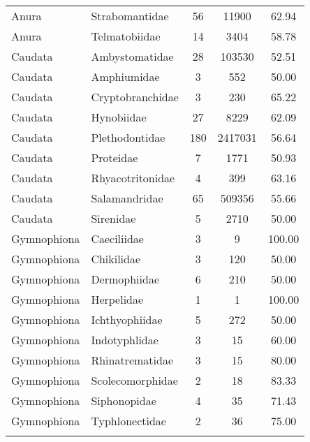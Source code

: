 \begin{longtable}{llccc}
  Anura & Strabomantidae &  56 & 11900 & 62.94 \\ 
  Anura & Telmatobiidae &  14 & 3404 & 58.78 \\ 
  Caudata & Ambystomatidae &  28 & 103530 & 52.51 \\ 
  Caudata & Amphiumidae &   3 & 552 & 50.00 \\ 
  Caudata & Cryptobranchidae &   3 & 230 & 65.22 \\ 
  Caudata & Hynobiidae &  27 & 8229 & 62.09 \\ 
  Caudata & Plethodontidae & 180 & 2417031 & 56.64 \\ 
  Caudata & Proteidae &   7 & 1771 & 50.93 \\ 
  Caudata & Rhyacotritonidae &   4 & 399 & 63.16 \\ 
  Caudata & Salamandridae &  65 & 509356 & 55.66 \\ 
  Caudata & Sirenidae &   5 & 2710 & 50.00 \\ 
  Gymnophiona & Caeciliidae &   3 &   9 & 100.00 \\ 
  Gymnophiona & Chikilidae &   3 & 120 & 50.00 \\ 
  Gymnophiona & Dermophiidae &   6 & 210 & 50.00 \\ 
  Gymnophiona & Herpelidae &   1 &   1 & 100.00 \\ 
  Gymnophiona & Ichthyophiidae &   5 & 272 & 50.00 \\ 
  Gymnophiona & Indotyphlidae &   3 &  15 & 60.00 \\ 
  Gymnophiona & Rhinatrematidae &   3 &  15 & 80.00 \\ 
  Gymnophiona & Scolecomorphidae &   2 &  18 & 83.33 \\ 
  Gymnophiona & Siphonopidae &   4 &  35 & 71.43 \\ 
  Gymnophiona & Typhlonectidae &   2 &  36 & 75.00 \\ 
   \hline
\label{table-family_amphibians}
\end{longtable}
